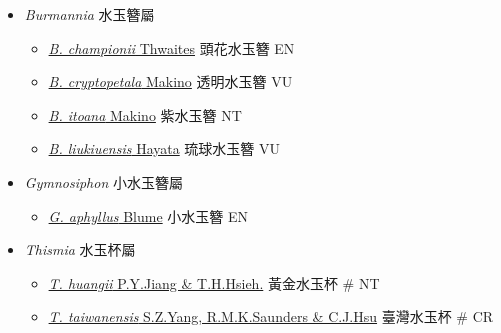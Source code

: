 
  \begin{itemize}
 \item[] \textit{Burmannia} 水玉簪屬
                                
  \begin{itemize}
        \item[] \href{http://www.theplantlist.org/tpl1.1/search?q=Burmannia+championii}{\textit{B. championii} Thwaites}   頭花水玉簪   EN
        \item[] \href{http://www.theplantlist.org/tpl1.1/search?q=Burmannia+cryptopetala}{\textit{B. cryptopetala} Makino}   透明水玉簪   VU
        \item[] \href{http://www.theplantlist.org/tpl1.1/search?q=Burmannia+itoana}{\textit{B. itoana} Makino}   紫水玉簪   NT
        \item[] \href{http://www.theplantlist.org/tpl1.1/search?q=Burmannia+liukiuensis}{\textit{B. liukiuensis} Hayata}   琉球水玉簪   VU
  \end{itemize}
 \item[] \textit{Gymnosiphon} 小水玉簪屬
                                
  \begin{itemize}
        \item[] \href{http://www.theplantlist.org/tpl1.1/search?q=Gymnosiphon+aphyllus}{\textit{G. aphyllus} Blume}   小水玉簪   EN
  \end{itemize}
 \item[] \textit{Thismia} 水玉杯屬
                                
  \begin{itemize}
        \item[] \href{http://www.theplantlist.org/tpl1.1/search?q=Thismia+huangii}{\textit{T. huangii} P.Y.Jiang \& T.H.Hsieh.}   黃金水玉杯  \# NT
        \item[] \href{http://www.theplantlist.org/tpl1.1/search?q=Thismia+taiwanensis}{\textit{T. taiwanensis} S.Z.Yang, R.M.K.Saunders \& C.J.Hsu}   臺灣水玉杯  \# CR
  \end{itemize}
  \end{itemize}
